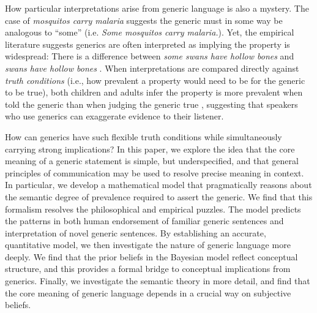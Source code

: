 \documentclass[12pt,letterpaper]{article}
\newcommand{\ndg}[1]{\textcolor{Green}{[ndg: #1]}}
\begin{document}

How particular interpretations arise from generic language is also a mystery.
The case of \emph{mosquitos carry malaria} suggests the generic must in some way be analogous to ``some'' (i.e. \emph{Some mosquitos carry malaria.}). 
Yet, the empirical literature suggests generics are often interpreted as implying the property is widespread:
There is a difference between \emph{some swans have hollow bones} and \emph{swans have hollow bones} \cite{Gelman2002}.
When interpretations are compared directly against \emph{truth conditions} (i.e., how prevalent a property would need to be for the generic to be true), both children and adults infer the property is more prevalent when told the generic than when judging the generic true \cite{Cimpian2010,Brandone2014}, suggesting that speakers who use generics can exaggerate evidence to their listener.

How can generics have such flexible truth conditions while simultaneously carrying strong implications?
In this paper, we explore the idea that the core meaning of a generic statement is simple, but underspecified, and that general principles of communication may be used to resolve precise meaning in context. 
In particular, we develop a mathematical model that pragmatically reasons about the semantic degree of prevalence required to assert the generic.  
We find that this formalism resolves the philosophical and empirical puzzles.
The model predicts the patterns in both human endorsement of familiar generic sentences and interpretation of novel generic sentences. 
By establishing an accurate, quantitative model, we then investigate the nature of generic language more deeply.
We find that the prior beliefs in the Bayesian model reflect conceptual structure, and this provides a formal bridge to conceptual implications from generics.
Finally, we investigate the semantic theory in more detail, and find that the core meaning of generic language depends in a crucial way on subjective beliefs.
\end{document}
